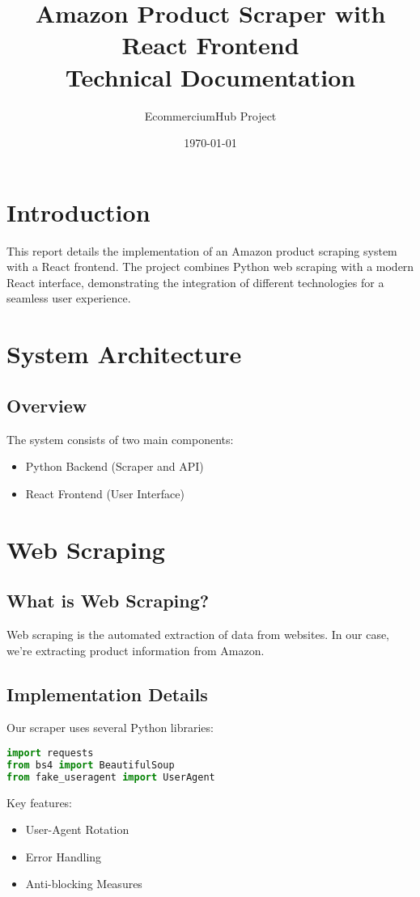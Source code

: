 \documentclass[12pt,a4paper]{article}
\title{Amazon Product Scraper with React Frontend\\
\large Technical Documentation}
\author{EcommerciumHub Project}
\date{\today}
\begin{document}
\maketitle

\tableofcontents

\newpage

\section{Introduction}
This report details the implementation of an Amazon product scraping system with a React frontend. The project combines Python web scraping with a modern React interface, demonstrating the integration of different technologies for a seamless user experience.

\section{System Architecture}
\subsection{Overview}
The system consists of two main components:
\begin{itemize}
    \item Python Backend (Scraper and API)
    \item React Frontend (User Interface)
\end{itemize}

\section{Web Scraping}
\subsection{What is Web Scraping?}
Web scraping is the automated extraction of data from websites. In our case, we're extracting product information from Amazon.

\subsection{Implementation Details}
Our scraper uses several Python libraries:
\begin{lstlisting}[language=Python]
import requests
from bs4 import BeautifulSoup
from fake_useragent import UserAgent
\end{lstlisting}

Key features:
\begin{itemize}
    \item User-Agent Rotation
    \item Error Handling
    \item Anti-blocking Measures
\end{itemize}
\end{document}
